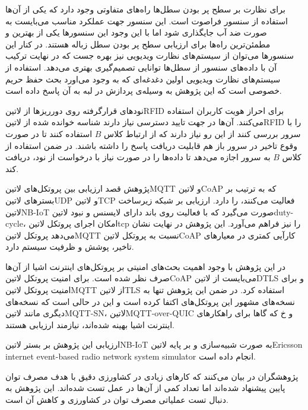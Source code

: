 برای نظارت بر سطح پر بودن سطل‌ها راه‌های متفاوتی وجود دارد که یکی از آن‌ها استفاده از سنسور فراصوت است. این سنسور جهت عملکرد مناسب می‌بایست به صورت ضد آب جایگذاری شود اما با این وجود
این سنسورها یکی از بهترین و مطمئن‌ترین راه‌ها برای ارزیابی سطح پر بودن سطل زباله هستند. در کنار این سنسورها می‌توان از سیستم‌های نظارت ویدیویی نیز بهره جست که در نهایت ترکیب آن با داده‌های سنسور
از سطل‌ها توانایی تصمیم‌گیری بهتری می‌دهد. استفاده از سیستم‌های نظارت ویدیویی اولین دغدغه‌ای که به وجود می‌اورد بحث حفظ حریم خصوصی است که این پژوهش به وسیله‌ی پردازش در لبه به آن پاسخ داده است.

نودهای قرارگرفته روی دورریزها از ‌لاتین{RFID} برای احراز هویت کاربران استفاده می‌کنند. آن‌ها در جهت تایید دسترسی نیاز دارند شناسه خوانده شده از ‌لاتین{RFID} را با سرور بررسی کنند
از این رو نیاز دارند که از ارتباط کلاس $B$ استفاده کنند تا در صورت وقوع تاخیر در سرور باز هم قابلیت دریافت پاسخ را داشته باشند. در ضمن استفاده از کلاس $B$ به سرور اجازه می‌دهد تا داده‌ها را
در صورت نیاز با درخواست از نود، دریافت کند.


پژوهش  قصد ارزیابی بین پروتکل‌های ‌لاتین{MQTT} و ‌لاتین{CoAP} که به ترتیب بر بسترهای ‌لاتین{UDP} و ‌لاتین{TCP} فعالیت می‌کنند، را دارد.
ارزیابی بر شبکه زیرساخت ‌لاتین{NB-IoT} صورت می‌گیرد که با فعالیت روی باند دارای لایسنس و نبود ‌لاتین{duty-cycle}، امکان اجرای پروتکل ‌لاتین{tcp} را نیز فراهم می‌آورد.
این پژوهش در نهایت نشان می‌دهد پروتکل ‌لاتین{MQTT} نسبت به پروتکل ‌لاتین{CoAP} کارآیی کمتری در معیارهای تاخیر، پوشش و ظرفیت سیستم دارد.

در این پژوهش با وجود اهمیت بحث‌های امنیتی بر پروتکل‌های اینترنت اشیا از آن‌ها صرف نظر شده است. برای امنیت پروتکل ‌لاتین{CoAP} می‌بایست از ‌لاتین{DTLS} و
برای امنیت پروتکل ‌لاتین{MQTT} از ‌لاتین{TLS} استفاده کرد.
در ضمن این پژوهش تنها به نسخه‌های مشهور این پروتکل‌های اکتفا کرده است و این در حالی است که نسخه‌های دیگری مانند ‌لاتین{MQTT-SN}، ‌لاتین{MQTT-over-QUIC} و ‌خ
که گاها برای راهکارهای اینترنت اشیا بهینه شده‌اند، نیازمند ارزیابی هستند.

ارزیابی این پژوهش بر بستر ‌لاتین{NB-IoT} به صورت شبیه‌سازی و بر پایه ‌لاتین{Ericsson internet event-based radio network system simulator} انجام داده است.


پژوهشگران در  بیان می‌کنند که کارهای زیادی در کشاورزی دقیق با هدف مصرف توان پایین پیشنهاد شده‌اند اما تعداد کمی از آن‌ها در عمل تست شده‌اند.
این پژوهش به دنبال تست عملیاتی مصرف توان در کشاورزی و کاهش آن است.

